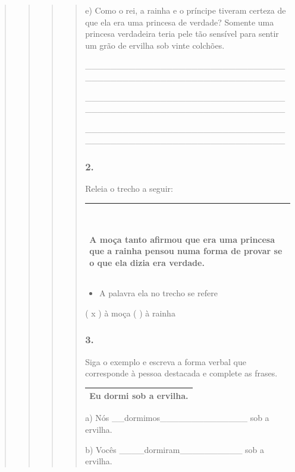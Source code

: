 \begin{quote}
\begin{quote}
\begin{quote}
\begin{quote}
e) Como o rei, a rainha e o príncipe tiveram certeza de que ela era uma
princesa de verdade? Somente uma princesa verdadeira teria pele tão
sensível para sentir um grão de ervilha sob vinte colchões.

\_\_\_\_\_\_\_\_\_\_\_\_\_\_\_\_\_\_\_\_\_\_\_\_\_\_\_\_\_\_\_\_\_\_\_\_\_\_\_\_\_\_\_\_\_\_\_\_\_\_\_\_\_\_\_\_\_\_\_\_\_\_\_\_

\_\_\_\_\_\_\_\_\_\_\_\_\_\_\_\_\_\_\_\_\_\_\_\_\_\_\_\_\_\_\_\_\_\_\_\_\_\_\_\_\_\_\_\_\_\_\_\_\_\_\_\_\_\_\_\_\_\_\_\_\_\_\_\_

\_\_\_\_\_\_\_\_\_\_\_\_\_\_\_\_\_\_\_\_\_\_\_\_\_\_\_\_\_\_\_\_\_\_\_\_\_\_\_\_\_\_\_\_\_\_\_\_\_\_\_\_\_\_\_\_\_\_\_\_\_\_\_\_

\subsubsection{2. }\label{section-72}

Releia o trecho a seguir:

\begin{longtable}[]{@{}l@{}}
\toprule
\begin{minipage}[t]{0.97\columnwidth}\raggedright\strut
~ ~

A moça tanto afirmou que era uma princesa que a rainha pensou numa forma
de provar se o que ela dizia era verdade.\strut
\end{minipage}\tabularnewline
\bottomrule
\end{longtable}

\begin{itemize}
\item
  A palavra ela no trecho se refere
\end{itemize}

( x ) à moça ( ) à rainha

\subsubsection{3. }\label{section-73}

Siga o exemplo e escreva a forma verbal que corresponde à pessoa
destacada e complete as frases.

\begin{longtable}[]{@{}l@{}}
\toprule
\textbf{Eu dormi} sob a ervilha.\tabularnewline
\bottomrule
\end{longtable}

a) Nós \_\_dormimos\_\_\_\_\_\_\_\_\_\_\_\_\_\_ sob a ervilha.

b) Vocês \_\_\_\_dormiram\_\_\_\_\_\_\_\_\_\_ sob a ervilha.


\end{quote}
\end{quote}
\end{quote}
\end{quote}
